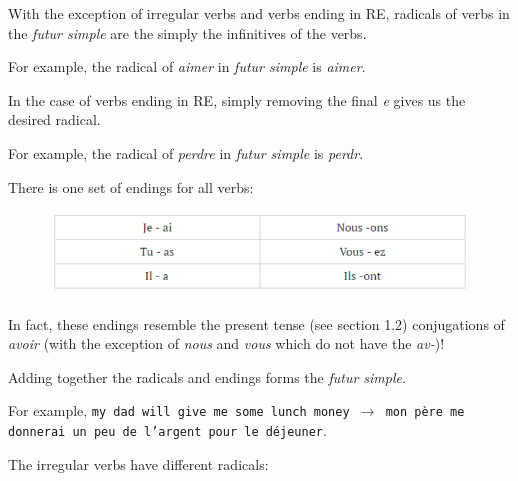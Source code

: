 \documentclass[11pt, oneside]{book}
\begin{document}
{With the exception of irregular verbs and verbs ending in RE, radicals of verbs in the \textit{futur simple} are the simply the infinitives of the verbs. \vspace{0.5\baselineskip}

For example, the radical of \textit{aimer} in \textit{futur simple} is \textit{aimer}. \vspace{0.5\baselineskip}

In the case of verbs ending in RE, simply removing the final \textit{e} gives us the desired radical. \vspace{0.5\baselineskip}

For example, the radical of \textit{perdre} in \textit{futur simple} is \textit{perdr}.  \vspace{0.5\baselineskip}

There is one set of endings for all verbs: \vspace{0.5\baselineskip}

\begin{figure}[H]
	\includegraphics[scale=0.65]{charts/futurEndings.png}
\end{figure} \vspace{0.5\baselineskip}

In fact, these endings resemble the present tense (see section 1.2) conjugations of \textit{avoir} (with the exception of \textit{nous} and \textit{vous} which do not have the \textit{av-})! \vspace{0.5\baselineskip}

Adding together the radicals and endings forms the \textit{futur simple}.  \vspace{0.5\baselineskip}

For example, \texttt{my dad will give me some lunch money $\rightarrow$ mon p\`ere me donnerai un peu de l'argent pour le d\'ejeuner}. \vspace{0.5\baselineskip}

The irregular verbs have different radicals: \vspace{0.5\baselineskip}

}
\end{document}
